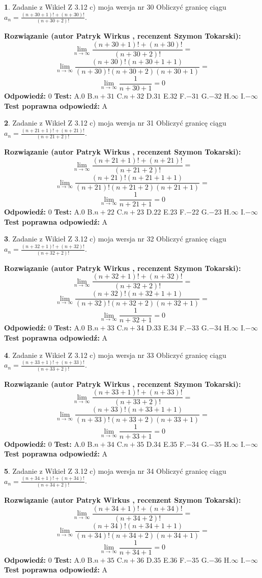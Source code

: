 \documentclass[12pt, a4paper]{article}
\theoremstyle{definition} %
\newtheorem{zad}{}
\newcommand{\zadStart}[1]{\begin{zad}#1\newline}
\newcommand{\zadStop}{\end{zad}}
\newcommand{\rozwStart}[2]{\noindent \textbf{Rozwiązanie (autor #1 , recenzent #2): }\newline}
\newcommand{\rozwStop}{\newline}
\newcommand{\odpStart}{\noindent \textbf{Odpowiedź:}\newline}
\newcommand{\odpStop}{\newline}
\newcommand{\testStart}{\noindent \textbf{Test:}\newline}
\newcommand{\testStop}{\newline}
\newcommand{\kluczStart}{\noindent \textbf{Test poprawna odpowiedź:}\newline}
\newcommand{\kluczStop}{\newline}
\begin{document}
\zadStart{Zadanie z Wikieł Z 3.12 c) moja wersja nr 30}
Obliczyć granicę ciągu $a_{n}=\frac{(n+30+1)!+(n+30)!}{(n+30+2)!}$.
\zadStop
\rozwStart{Patryk Wirkus}{Szymon Tokarski}
$$\lim\limits_{n\to\infty}\frac{(n+30+1)!+(n+30)!}{(n+30+2)!}=$$
$$\lim\limits_{n\to\infty}\frac{(n+30)!(n+30+1+1)}{(n+30)!(n+30+2)(n+30+1)}=$$
$$\lim\limits_{n\to\infty}\frac{1}{n+30+1}= 0$$
\rozwStop
\odpStart
$0$
\odpStop
\testStart
A.$0$
B.$n+31$
C.$n+32$
D.$31$
E.$32$
F.$-31$
G.$-32$
H.$\infty$
I.$-\infty$
\testStop
\kluczStart
A
\kluczStop



\zadStart{Zadanie z Wikieł Z 3.12 c) moja wersja nr 31}
Obliczyć granicę ciągu $a_{n}=\frac{(n+21+1)!+(n+21)!}{(n+21+2)!}$.
\zadStop
\rozwStart{Patryk Wirkus}{Szymon Tokarski}
$$\lim\limits_{n\to\infty}\frac{(n+21+1)!+(n+21)!}{(n+21+2)!}=$$
$$\lim\limits_{n\to\infty}\frac{(n+21)!(n+21+1+1)}{(n+21)!(n+21+2)(n+21+1)}=$$
$$\lim\limits_{n\to\infty}\frac{1}{n+21+1}= 0$$
\rozwStop
\odpStart
$0$
\odpStop
\testStart
A.$0$
B.$n+22$
C.$n+23$
D.$22$
E.$23$
F.$-22$
G.$-23$
H.$\infty$
I.$-\infty$
\testStop
\kluczStart
A
\kluczStop



\zadStart{Zadanie z Wikieł Z 3.12 c) moja wersja nr 32}
Obliczyć granicę ciągu $a_{n}=\frac{(n+32+1)!+(n+32)!}{(n+32+2)!}$.
\zadStop
\rozwStart{Patryk Wirkus}{Szymon Tokarski}
$$\lim\limits_{n\to\infty}\frac{(n+32+1)!+(n+32)!}{(n+32+2)!}=$$
$$\lim\limits_{n\to\infty}\frac{(n+32)!(n+32+1+1)}{(n+32)!(n+32+2)(n+32+1)}=$$
$$\lim\limits_{n\to\infty}\frac{1}{n+32+1}= 0$$
\rozwStop
\odpStart
$0$
\odpStop
\testStart
A.$0$
B.$n+33$
C.$n+34$
D.$33$
E.$34$
F.$-33$
G.$-34$
H.$\infty$
I.$-\infty$
\testStop
\kluczStart
A
\kluczStop



\zadStart{Zadanie z Wikieł Z 3.12 c) moja wersja nr 33}
Obliczyć granicę ciągu $a_{n}=\frac{(n+33+1)!+(n+33)!}{(n+33+2)!}$.
\zadStop
\rozwStart{Patryk Wirkus}{Szymon Tokarski}
$$\lim\limits_{n\to\infty}\frac{(n+33+1)!+(n+33)!}{(n+33+2)!}=$$
$$\lim\limits_{n\to\infty}\frac{(n+33)!(n+33+1+1)}{(n+33)!(n+33+2)(n+33+1)}=$$
$$\lim\limits_{n\to\infty}\frac{1}{n+33+1}= 0$$
\rozwStop
\odpStart
$0$
\odpStop
\testStart
A.$0$
B.$n+34$
C.$n+35$
D.$34$
E.$35$
F.$-34$
G.$-35$
H.$\infty$
I.$-\infty$
\testStop
\kluczStart
A
\kluczStop



\zadStart{Zadanie z Wikieł Z 3.12 c) moja wersja nr 34}
Obliczyć granicę ciągu $a_{n}=\frac{(n+34+1)!+(n+34)!}{(n+34+2)!}$.
\zadStop
\rozwStart{Patryk Wirkus}{Szymon Tokarski}
$$\lim\limits_{n\to\infty}\frac{(n+34+1)!+(n+34)!}{(n+34+2)!}=$$
$$\lim\limits_{n\to\infty}\frac{(n+34)!(n+34+1+1)}{(n+34)!(n+34+2)(n+34+1)}=$$
$$\lim\limits_{n\to\infty}\frac{1}{n+34+1}= 0$$
\rozwStop
\odpStart
$0$
\odpStop
\testStart
A.$0$
B.$n+35$
C.$n+36$
D.$35$
E.$36$
F.$-35$
G.$-36$
H.$\infty$
I.$-\infty$
\testStop
\kluczStart
A
\kluczStop
\end{document}
